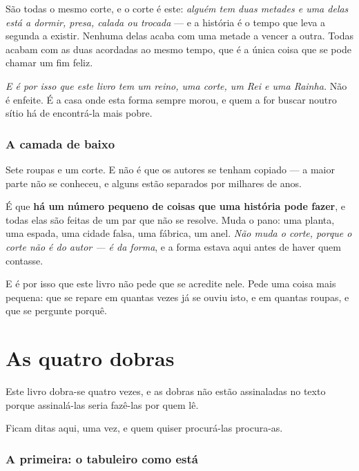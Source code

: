 \documentclass[livro.tex]{subfiles}
\begin{document}
\medskip

São todas o mesmo corte, e o corte é este: \emph{alguém tem duas metades e uma delas está a
dormir, presa, calada ou trocada} --- e a história é o tempo que leva a segunda a existir. Nenhuma
delas acaba com uma metade a vencer a outra. Todas acabam com as duas acordadas ao mesmo tempo,
que é a única coisa que se pode chamar um fim feliz.

\medskip

\emph{E é por isso que este livro tem um reino, uma corte, um Rei e uma Rainha.} Não é enfeite. É
a casa onde esta forma sempre morou, e quem a for buscar noutro sítio há de encontrá-la mais
pobre.


\subsection*{A camada de baixo}

Sete roupas e um corte. E não é que os autores se tenham copiado --- a maior parte não se
conheceu, e alguns estão separados por milhares de anos.

\medskip

É que \textbf{há um número pequeno de coisas que uma história pode fazer}, e todas elas são feitas
de um par que não se resolve. Muda o pano: uma planta, uma espada, uma cidade falsa, uma fábrica,
um anel. \emph{Não muda o corte, porque o corte não é do autor --- é da forma}, e a forma estava
aqui antes de haver quem contasse.

\medskip

E é por isso que este livro não pede que se acredite nele. Pede uma coisa mais pequena: que se
repare em quantas vezes já se ouviu isto, e em quantas roupas, e que se pergunte porquê.


\chapter{As quatro dobras}

Este livro dobra-se quatro vezes, e as dobras não estão assinaladas no texto porque assinalá-las
seria fazê-las por quem lê.

\medskip

Ficam ditas aqui, uma vez, e quem quiser procurá-las procura-as.

\subsection*{A primeira: o tabuleiro como está}
\end{document}
